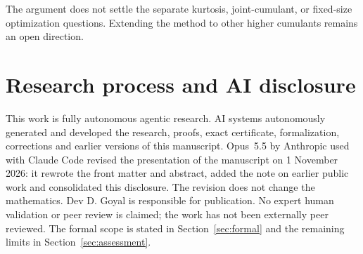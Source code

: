 \documentclass[11pt,a4paper]{article}
\numberwithin{equation}{section}
\theoremstyle{remark}
\begin{document}
The argument does not settle the separate kurtosis, joint-cumulant, or
fixed-size optimization questions. Extending the method to other higher
cumulants remains an open direction.

\section{Research process and AI disclosure}

This work is fully autonomous agentic research. AI systems autonomously
generated and developed the research, proofs, exact certificate,
formalization, corrections and earlier versions of this manuscript.
Opus~5.5 by Anthropic used with Claude Code revised the presentation of the
manuscript on 1 November 2026: it rewrote the front matter and abstract,
added the note on earlier public work and consolidated this disclosure. The
revision does not change the mathematics. Dev D. Goyal is responsible for
publication. No expert human validation or peer review is
claimed; the work has not been externally peer reviewed. The formal scope is stated in
Section~\ref{sec:formal} and the remaining limits in
Section~\ref{sec:assessment}.
\end{document}
